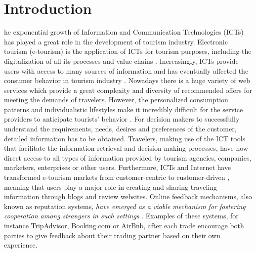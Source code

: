 %
%
\let\textcircled=\pgftextcircled
\chapter{Introduction}
\label{chap:intro}
%
%
he exponential growth of Information and Communication Technologies (ICTs) has played a great role in the development of tourism industry. Electronic tourism (e-tourism) is the application of ICTs for tourism purposes, including the digitalization of all its processes and value chains \cite{buhalis2003etourism}. Increasingly, ICTs provide users with access to many sources of information and has eventually affected the consumer behavior in tourism industry \cite{mills2004handbook}. Nowadays there is a huge variety of web services which provide a great complexity and diversity of recommended offers for meeting the demands of travelers. However, the personalized consumption patterns and individualistic lifestyles make it incredibly difficult for the service providers to anticipate tourists' behavior \cite{niemann2008enhancing}. For decision makers to successfully understand the requirements, needs, desires and preferences of the customer, detailed information has to be obtained. Travelers, making use of the ICT tools that facilitate the information retrieval and decision making processes, have now direct access to all types of information provided by tourism agencies, companies, marketers, enterprises or other users. Furthermore, ICTs and Internet have transformed e-tourism markets from customer-centric to customer-driven \cite{buhalis2011tourism}, meaning that users play a major role in creating and sharing traveling information through blogs and review websites. Online feedback mechanisms, also known as reputation systems, \textit{have emerged as a viable mechanism for fostering cooperation among strangers in such settings} \cite{dellarocas2003digitization}. Examples of these systems, for instance TripAdvisor, Booking.com or AirBnb, after each trade encourage both parties to give feedback about their trading partner based on their own experience. 
